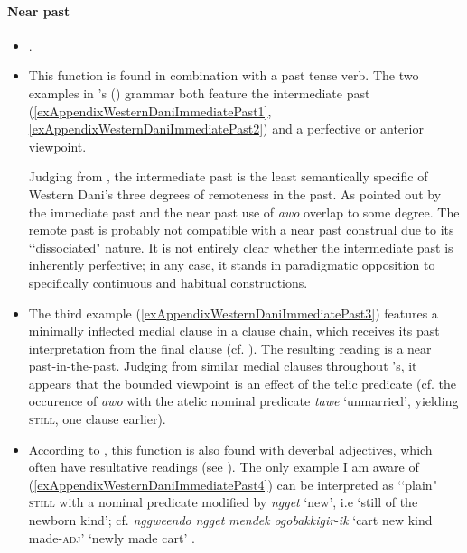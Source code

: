 \paragraph{Near past}\label{appendixWesternDaniNearPast}
\begin{itemize}
	\item \textcite[440]{Barclay2008}.
	\item This function is found in combination with a past tense verb. The two examples in \citeauthor{Barclay2008}'s (\citeyear{Barclay2008}) grammar both feature the intermediate past  (\ref{exAppendixWesternDaniImmediatePast1}, \ref{exAppendixWesternDaniImmediatePast2}) and a perfective or anterior viewpoint.
	
	Judging from \textcite[253–263]{Barclay2008}, the intermediate past is the least semantically specific of Western Dani's three degrees of remoteness in the past. As pointed out by \textcite[440]{Barclay2008} the immediate past and the near past use of \textit{awo} overlap to some degree. The remote past is probably not compatible with a near past construal due to its \lq\lq dissociated" \parencite{BotneKershner2008} nature. It is not entirely clear whether the intermediate past is inherently perfective; in any case, it stands in paradigmatic opposition to specifically continuous and habitual constructions. 
	
	\item The third example (\ref{exAppendixWesternDaniImmediatePast3}) features a minimally inflected medial clause in a clause chain, which receives its past interpretation from the final clause (cf. \cite[615–617]{Barclay2008}). The resulting reading is a near past-in-the-past. Judging from similar medial clauses throughout \citeauthor{Barclay2008}'s, it appears that the bounded viewpoint is an effect of the telic predicate (cf. the occurence of \textit{awo} with the atelic nominal predicate \textit{tawe} \lq unmarried', yielding \textsc{still}, one clause earlier).
	
	\item According to \textcite[440]{Barclay2008}, this function is also found with deverbal adjectives, which often have resultative readings (see \cite[101–105]{Barclay2008}). The only example I am aware of (\ref{exAppendixWesternDaniImmediatePast4}) can be interpreted as \lq\lq plain" \textsc{still} with a nominal predicate modified by \textit{ngget} \lq new', i.e \lq still of the newborn kind'; cf. \mbox{\textit{nggweendo}}  \mbox{\textit{ngget}}  \mbox{\textit{mendek}}  \mbox{\textit{ogobakkigir}-\textit{ik}} \lq cart new kind made-\textsc{adj}' \lq newly made cart' \parencite[369]{Barclay2008}.
\end{itemize}

